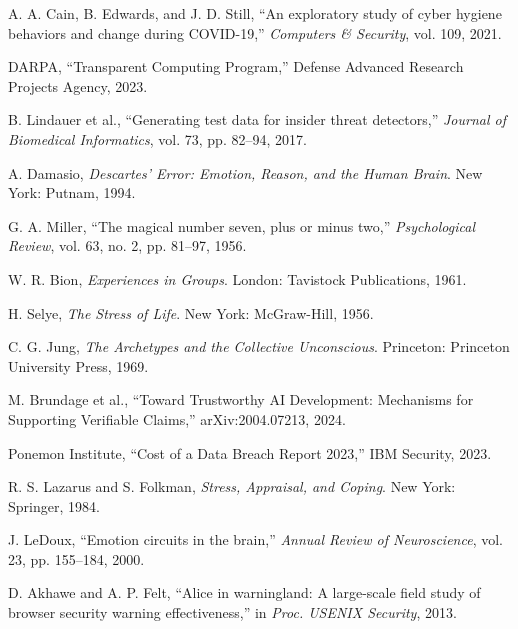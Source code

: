 \documentclass[10pt,twocolumn]{IEEEtran}
\begin{document}
\begin{thebibliography}{99}
A. A. Cain, B. Edwards, and J. D. Still, ``An exploratory study of cyber hygiene behaviors and change during COVID-19,'' \emph{Computers \& Security}, vol. 109, 2021.

DARPA, ``Transparent Computing Program,'' Defense Advanced Research Projects Agency, 2023.

B. Lindauer et al., ``Generating test data for insider threat detectors,'' \emph{Journal of Biomedical Informatics}, vol. 73, pp. 82--94, 2017.

A. Damasio, \emph{Descartes' Error: Emotion, Reason, and the Human Brain}. New York: Putnam, 1994.

G. A. Miller, ``The magical number seven, plus or minus two,'' \emph{Psychological Review}, vol. 63, no. 2, pp. 81--97, 1956.

W. R. Bion, \emph{Experiences in Groups}. London: Tavistock Publications, 1961.

H. Selye, \emph{The Stress of Life}. New York: McGraw-Hill, 1956.

C. G. Jung, \emph{The Archetypes and the Collective Unconscious}. Princeton: Princeton University Press, 1969.

M. Brundage et al., ``Toward Trustworthy AI Development: Mechanisms for Supporting Verifiable Claims,'' arXiv:2004.07213, 2024.

Ponemon Institute, ``Cost of a Data Breach Report 2023,'' IBM Security, 2023.

R. S. Lazarus and S. Folkman, \emph{Stress, Appraisal, and Coping}. New York: Springer, 1984.

J. LeDoux, ``Emotion circuits in the brain,'' \emph{Annual Review of Neuroscience}, vol. 23, pp. 155--184, 2000.

D. Akhawe and A. P. Felt, ``Alice in warningland: A large-scale field study of browser security warning effectiveness,'' in \emph{Proc. USENIX Security}, 2013.

\end{thebibliography}
\end{document}
